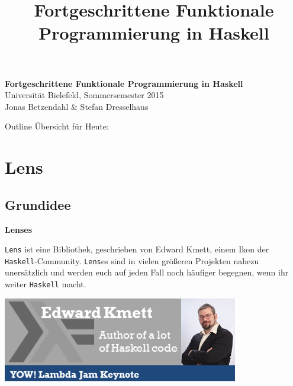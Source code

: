 \documentclass{beamer}
\title{Fortgeschrittene Funktionale Programmierung in Haskell}
\begin{document}
  

  \begin{frame}
  \begin{center}
    \huge\textbf{Fortgeschrittene Funktionale Programmierung in Haskell}\\ \bigskip
    \LARGE Universität Bielefeld, Sommersemester 2015\\ \bigskip
    \large Jonas Betzendahl \& Stefan Dresselhaus
    \end{center}
  \end{frame}

\begin{frame}[allowframebreaks]{Outline}
Übersicht für Heute:\smallskip

\tableofcontents
\end{frame}

\section{Lens}
\subsection{Grundidee}

\begin{frame}

\begin{center}
\Large
\textbf{Lenses}
\end{center}

\end{frame}


\begin{frame}

\texttt{Lens} ist eine Bibliothek, geschrieben von Edward Kmett, einem 
Ikon der \texttt{Haskell}-Community. \texttt{Lens}es sind in vielen 
größeren Projekten nahezu unersätzlich und werden euch auf jeden Fall noch
häufiger begegnen, wenn ihr weiter \texttt{Haskell} macht.
\bigskip

\begin{center}
\includegraphics[scale=1]{kmett.png} 
\end{center}

\end{frame}
\end{document}
